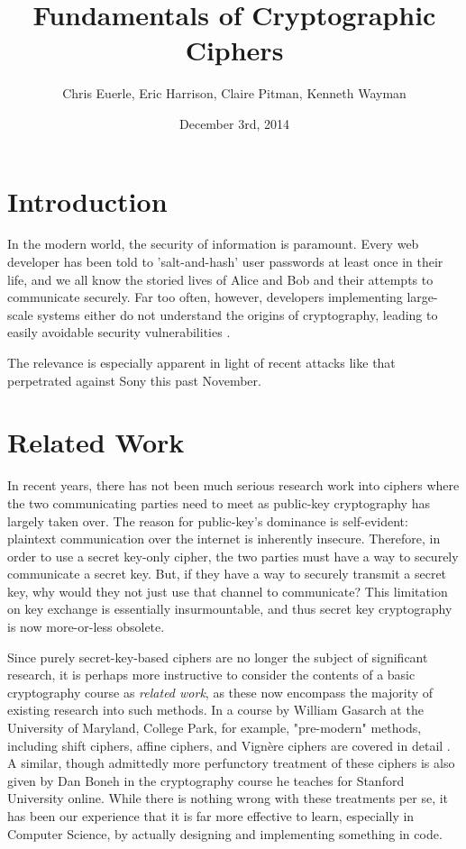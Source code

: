 \documentclass[11pt]{article}
\title{\textbf{Fundamentals of Cryptographic Ciphers}}
\author{Chris Euerle, Eric Harrison, Claire Pitman, Kenneth Wayman}
\date{December 3rd, 2014}
\newcommand\newl{\vspace{3mm}}
\newcommand\tab{\hspace{4mm}}
\begin{document}
\maketitle
\section{Introduction}

\tab
In the modern world, the security of information is paramount. 
Every web developer has been told to 'salt-and-hash' user passwords at least once in their life, and we all know the storied lives of Alice and Bob and their attempts to communicate securely. 
Far too often, however, developers implementing large-scale systems either do not understand the origins of cryptography, leading to easily avoidable security vulnerabilities \cite{Software-Security}.

\newl

The relevance is especially apparent in light of recent attacks like that perpetrated against Sony this past November.  

\section{Related Work}%
\tab	
In recent years, there has not been much serious research work into ciphers where the two communicating parties need to meet as public-key cryptography has largely taken over.  
The reason for public-key's dominance is self-evident: plaintext communication over the internet is inherently insecure. 
Therefore, in order to use a secret key-only cipher, the two parties must have a way to securely communicate a secret key.  
But, if they have a way to securely transmit a secret key, why would they not just use that channel to communicate? \cite{Coursera}   
This limitation on key exchange is essentially insurmountable, and thus secret key cryptography is now more-or-less obsolete.  

\newl

Since purely secret-key-based ciphers are no longer the subject of significant research, it is perhaps more instructive to consider the contents of a basic cryptography course as \emph{related work}, as these now encompass the majority of existing research into such methods.
In a course by William Gasarch at the University of Maryland, College Park, for example, "pre-modern" methods, including shift ciphers, affine ciphers, and Vign\`ere ciphers are covered in detail \cite{Alice-and-Bob}.
A similar, though admittedly more perfunctory treatment of these ciphers is also given by Dan Boneh in the cryptography course he teaches for Stanford University online.
While there is nothing wrong with these treatments per se, it has been our experience that it is far more effective to learn, especially in Computer Science, by actually designing and implementing something in code.
\newpage
\end{document}
